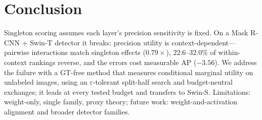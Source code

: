 \enlargethispage{5\baselineskip}
\section{Conclusion}
\label{sec:concl}

Singleton scoring assumes each layer's precision sensitivity is
fixed. On a Mask R-CNN + Swin-T detector it breaks:
precision utility is context-dependent---pairwise interactions match
singleton effects ($0.79\times$), $22.6$--$32.0\%$ of within-context
rankings reverse, and the errors cost measurable AP ($-3.56$). We
address the failure with a GT-free method that measures conditional
marginal utility on unlabeled images, using an $\varepsilon$-tolerant
split-half search and budget-neutral exchanges; it leads at every
tested budget and transfers to Swin-S. Limitations: weight-only, single family, proxy theory; future
work: weight-and-activation alignment and broader detector families.
